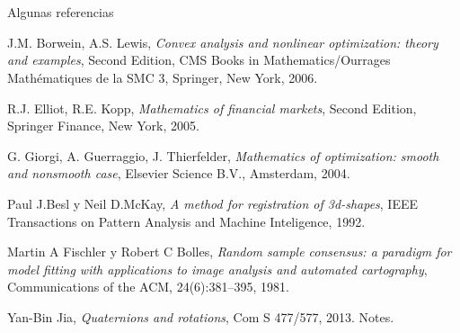 \documentclass[9pt]{beamer}
\begin{document}
	\section{}
	\begin{frame}{Algunas referencias}
		\justifying
		\begin{thebibliography}{X}
			 J.M. Borwein, A.S. Lewis, \textsl{Convex analysis and nonlinear optimization: theory and examples}, Second Edition, CMS Books in Mathematics/Ourrages Mathématiques de la SMC 3, Springer, New York, 2006.
			
			 R.J. Elliot, R.E. Kopp, \textsl{Mathematics of financial markets}, Second Edition, Springer Finance, New York, 2005.
			
			 G. Giorgi, A. Guerraggio, J. Thierfelder, \textsl{Mathematics of optimization: smooth and nonsmooth case}, Elsevier Science B.V., Amsterdam, 2004.
			
			 Paul J.Besl y Neil D.McKay, \textsl{A method for registration of 3d-shapes}, IEEE Transactions on Pattern Analysis and Machine Inteligence, 1992.
			
			 Martin A Fischler y Robert C Bolles, \textsl{Random sample consensus: a paradigm for model fitting with applications to image analysis and automated cartography}, Communications of the ACM, 24(6):381–395, 1981.
			
			 Yan-Bin Jia, \textsl{Quaternions and rotations}, Com S 477/577, 2013.
			Notes.
		
		\end{thebibliography}
	\end{frame}
	
\end{document}
